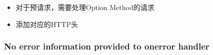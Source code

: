 \begin{itemize}
\item 对于预请求，需要处理Option Method的请求
\item 添加对应的HTTP头
\end{itemize}


\subsubsection{No error information provided to onerror handler}


